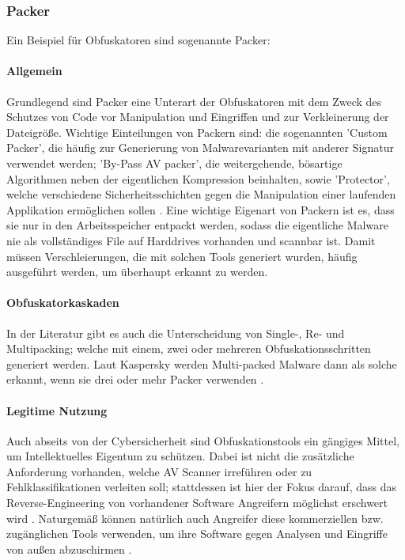 \subsubsection{Packer}
Ein Beispiel für Obfuskatoren sind sogenannte Packer:
\paragraph{Allgemein}
Grundlegend sind Packer eine Unterart der Obfuskatoren mit dem Zweck des Schutzes von Code vor Manipulation und Eingriffen und zur Verkleinerung der Dateigröße. Wichtige Einteilungen von Packern sind: die sogenannten 'Custom Packer', die häufig zur Generierung von Malwarevarianten mit anderer Signatur verwendet werden; 'By-Pass AV packer', die weitergehende, bösartige Algorithmen neben der eigentlichen Kompression beinhalten\cite{homelandsecuritytoday_2018_increased}, sowie 'Protector', welche verschiedene Sicherheitsschichten gegen die Manipulation einer laufenden Applikation ermöglichen sollen \cite{alkhateeb_2023_a}.
Eine wichtige Eigenart von Packern ist es, dass sie nur in den Arbeitsspeicher entpackt werden, sodass die eigentliche Malware nie als vollständiges File auf Harddrives vorhanden und scannbar ist\cite{alkhateeb_2023_a}. Damit müssen Verschleierungen, die mit solchen Tools generiert wurden, häufig ausgeführt werden, um überhaupt erkannt zu werden.

\paragraph{Obfuskatorkaskaden}
In der Literatur gibt es auch die Unterscheidung von Single-, Re- und Multipacking; welche mit einem, zwei oder mehreren Obfuskationsschritten generiert werden. Laut Kaspersky werden Multi-packed Malware dann als solche erkannt, wenn sie drei oder mehr Packer verwenden \cite{kaspersky_2013_multipacked}.

\paragraph{Legitime Nutzung}
Auch abseits von der Cybersicherheit sind Obfuskationstools ein gängiges Mittel, um Intellektuelles Eigentum zu schützen. Dabei ist nicht die zusätzliche Anforderung vorhanden, welche AV Scanner irreführen oder zu Fehlklassifikationen verleiten soll; stattdessen ist hier der Fokus darauf, dass das Reverse-Engineering von vorhandener Software Angreifern möglichst erschwert wird \cite{drape_2010_intellectual, nandeeshaveeranna_2017_efficient}. Naturgemäß können natürlich auch Angreifer diese kommerziellen bzw. zugänglichen Tools verwenden, um ihre Software gegen Analysen und Eingriffe von außen abzuschirmen \cite{alkhateeb_2023_a}.


